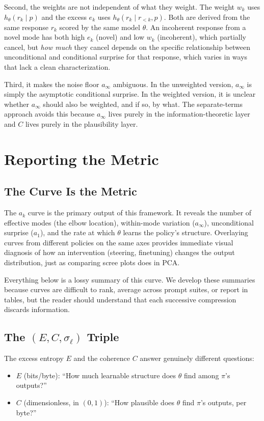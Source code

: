 \documentclass[11pt]{article}
\begin{document}
Second, the weights are not independent of what they weight. The weight $w_k$ uses $h_\theta(r_k \mid p)$ and the excess $e_k$ uses $h_\theta(r_k \mid r_{<k}, p)$. Both are derived from the same response $r_k$ scored by the same model $\theta$. An incoherent response from a novel mode has both high $e_k$ (novel) and low $w_k$ (incoherent), which partially cancel, but \emph{how much} they cancel depends on the specific relationship between unconditional and conditional surprise for that response, which varies in ways that lack a clean characterization.

Third, it makes the noise floor $a_\infty$ ambiguous. In the unweighted version, $a_\infty$ is simply the asymptotic conditional surprise. In the weighted version, it is unclear whether $a_\infty$ should also be weighted, and if so, by what. The separate-terms approach avoids this because $a_\infty$ lives purely in the information-theoretic layer and $C$ lives purely in the plausibility layer.

\section{Reporting the Metric}

\subsection{The Curve Is the Metric}

The $a_k$ curve is the primary output of this framework. It reveals the number of effective modes (the elbow location), within-mode variation ($a_\infty$), unconditional surprise ($a_1$), and the rate at which $\theta$ learns the policy's structure. Overlaying curves from different policies on the same axes provides immediate visual diagnosis of how an intervention (steering, finetuning) changes the output distribution, just as comparing scree plots does in PCA.

Everything below is a lossy summary of this curve. We develop these summaries because curves are difficult to rank, average across prompt suites, or report in tables, but the reader should understand that each successive compression discards information.

\subsection{The $(E, C, \sigma_\ell)$ Triple}

The excess entropy $E$ and the coherence $C$ answer genuinely different questions:
\begin{itemize}[nosep]
    \item $E$ (bits/byte): ``How much learnable structure does $\theta$ find among $\pi$'s outputs?''
    \item $C$ (dimensionless, in $(0,1)$): ``How plausible does $\theta$ find $\pi$'s outputs, per byte?''
\end{itemize}
\end{document}
